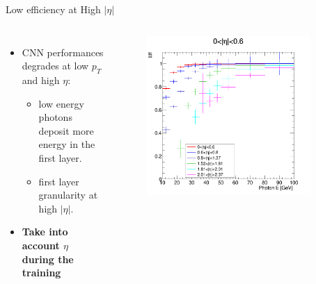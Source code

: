 \begin{frame}{Low efficiency at High $|\eta|$}

\begin{columns}
\begin{itemize}
    \item CNN performances degrades at low $p_T$ and high $\eta$:
    \begin{itemize}
        \item low energy photons deposit more energy in the first layer.
        \item first layer granularity at high $|\eta|$.
    \end{itemize}
    \item \textbf{Take into account $\eta$ during the training}
\end{itemize}
    \begin{figure}
        \centering
        \includegraphics[width=0.9\textwidth]{BackUp/Part6/Img/Eff_vs_Energy.png}
    \end{figure}
\end{columns}
\end{frame}

